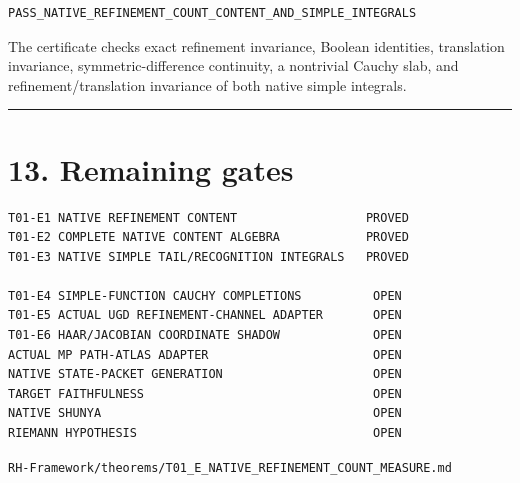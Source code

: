 \begin{verbatim}
PASS_NATIVE_REFINEMENT_COUNT_CONTENT_AND_SIMPLE_INTEGRALS
\end{verbatim}

The certificate checks exact refinement invariance, Boolean identities,
translation invariance, symmetric-difference continuity, a nontrivial Cauchy
slab, and refinement/translation invariance of both native simple integrals.

\begin{center}\rule{0.5\linewidth}{0.5pt}\end{center}

\hypertarget{remaining-gates}{%
\section{13. Remaining gates}\label{remaining-gates}}

\begin{verbatim}
T01-E1 NATIVE REFINEMENT CONTENT                  PROVED
T01-E2 COMPLETE NATIVE CONTENT ALGEBRA            PROVED
T01-E3 NATIVE SIMPLE TAIL/RECOGNITION INTEGRALS   PROVED

T01-E4 SIMPLE-FUNCTION CAUCHY COMPLETIONS          OPEN
T01-E5 ACTUAL UGD REFINEMENT-CHANNEL ADAPTER       OPEN
T01-E6 HAAR/JACOBIAN COORDINATE SHADOW             OPEN
ACTUAL MP PATH-ATLAS ADAPTER                       OPEN
NATIVE STATE-PACKET GENERATION                     OPEN
TARGET FAITHFULNESS                                OPEN
NATIVE SHUNYA                                      OPEN
RIEMANN HYPOTHESIS                                 OPEN
\end{verbatim}

\begin{flushright}\small\texttt{RH-Framework/theorems/T01\_E\_NATIVE\_REFINEMENT\_COUNT\_MEASURE.md}\end{flushright}
